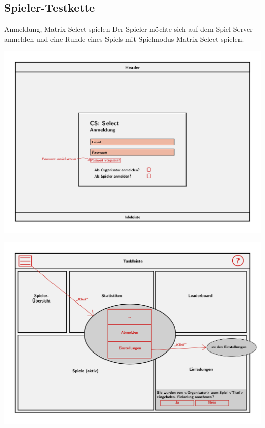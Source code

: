 \documentclass[xcolor=dvipsnames]{beamer}
\begin{document}
    \subsection{Spieler-Testkette} 
    \begin{frame}
    	\begin{block}{Anmeldung, Matrix Select spielen}
    		Der Spieler möchte sich auf dem Spiel-Server anmelden und eine Runde eines Spiels mit Spielmodus Matrix Select spielen.
    	\end{block}
    	\includegraphics[width=\textwidth]{../../pictures/Anmeldung.jpg}
    \end{frame}
	\begin{frame}
	\includegraphics[width=\textwidth]{../../pictures/5_Spieler.jpg}
	\end{frame}
\end{document}

